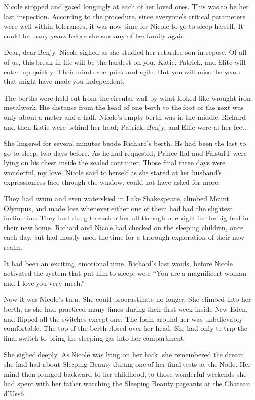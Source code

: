 \documentclass[]{article}
\begin{document}
{Nicole stopped and gazed longingly at each of her loved ones.  This was to be her last inspection.  According to the procedure, since everyone’s critical parameters were well within tolerances, it was now time for Nicole to go to sleep herself.  It could be many years before she saw any of her family again.

Dear, dear Benjy.  Nicole sighed as she studied her retarded son in repose.  Of all of us, this break in life will be the hardest on you.  Katie, Patrick, and Elite will catch up quickly.  Their minds are quick and agile.  But you will miss the years that might have made you independent.

The berths were held out from the circular wall by what looked like wrought-iron metalwork.  Hie distance from the head of one berth to the foot of the next was only about a meter and a half.  Nicole’s empty berth was in the middle; Richard and then Katie were behind her head; Patrick, Benjy, and Ellie were at her feet.

She lingered for several minutes beside Richard’s berth.  He had been the last to go to sleep, two days before.  As he had requested, Prince Hal and FalstafT were lying on his chest inside the sealed container.  Those final three days were wonderful, my love, Nicole said to herself as she stared at her husband’s expressionless face through the window.  could not have asked for more.

They had swum and even waterskied in Lake Shakespeare, climbed Mount Olympus, and made love whenever either one of them had had the slightest inclination.  They had clung to each other all through one night in the big bed in their new home.  Richard and Nicole had checked on the sleeping children, once each day, but had mostly used the time for a thorough exploration of their new realm.

It had been an exciting, emotional time.  Richard’s last words, before Nicole activated the system that put him to sleep, were “You are a magnificent woman and I love you very much.”

Now it was Nicole’s turn.  She could procrastinate no longer.  She climbed into her berth, as she had practiced many times during their first week inside New Eden, and flipped all the switches except one.  The foam around her was unbelievably comfortable.  The top of the berth closed over her head.  She had only to trip the final switch to bring the sleeping gas into her compartment.

She sighed deeply.  As Nicole was lying on her back, she remembered the dream she had had about Sleeping Beauty during one of her final tests at the Node.  Her mind then plunged backward to her childhood, to those wonderful weekends she had spent with her father watching the Sleeping Beauty pageants at the Chateau d’Uss6.

}
\end{document}
